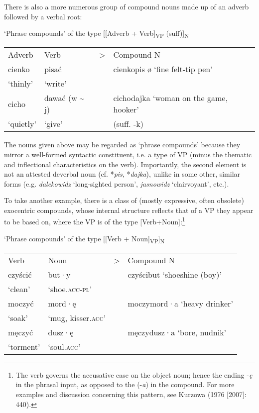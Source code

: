 \documentclass[output=paper]{LSP/langsci}
\begin{document}
There is also a more numerous group of compound nouns made up of an adverb followed by a verbal root:

\ea\label{ex:szymanek:17}
‘Phrase compounds’ of the type [[Adverb + Verb]{\textsubscript{VP}} {(suff)]}{\textsubscript{N}}\\

\begin{tabular}{llll}
 Adverb & Verb &>& Compound N\\
 cienko &   pisać  & &   cienkopis ø  ‘fine felt-tip pen’\\
  ‘thinly’ &   ‘write’&&\\
\tablevspace
  cicho  &  dawać (w {\textasciitilde} j) &&   cichodajka  ‘woman on the game, hooker’\\
  ‘quietly’ & ‘give’    &&     (suff. -k)\\
  \end{tabular}
\z 

{The nouns given above may be regarded as ‘phrase compounds’ because they mirror a well-formed syntactic constituent, i.e. a type of VP (minus the thematic and inflectional characteristics on the verb). Importantly, the second element is not an attested deverbal noun (cf. *}{\textit{pis}}{, *}{\textit{dajka}}{), unlike in some other, similar forms (e.g.} {\textit{dalekowidz}} {‘long-sighted person’,} {\textit{jasnowidz}} {‘clairvoyant’, etc.).} 

{To take another example, there is a class of (mostly expressive, often obsolete) exocentric compounds, whose internal structure reflects that of a VP they appear to be based on, where the VP is of the type [Verb+Noun]:}\footnote{{The verb governs the accusative case on the object noun; hence the ending -}{\textit{ę}} {in the phrasal input, as opposed to the  (-}{\textit{a}}{) in the compound. For more examples and discussion concerning this pattern, see Kurzowa (1976 [2007]: 440).}}\newpage

\ea\label{ex:szymanek:18} 
‘Phrase compounds’ of the type [[Verb + Noun]{\textsubscript{VP}}]{\textsubscript{N}}\\

\begin{tabular}{llll}
 Verb & Noun &> &Compound N\\
 czyścić  &   but·y   &&    czyścibut   ‘shoeshine (boy)’\\
 ‘clean’  &  ‘shoe.\textsc{acc-pl}’\\
 \tablevspace
 moczyć  &  mord·ę  &&    moczymord·a  ‘heavy drinker’\\
 ‘soak’   & ‘mug, kisser.\textsc{acc}’\\
 \tablevspace
 męczyć   & dusz·ę   &&   męczydusz·a  ‘bore, nudnik’\\
 ‘torment’&  ‘soul.\textsc{acc}’\\
 \end{tabular}
\z 
\end{document}
